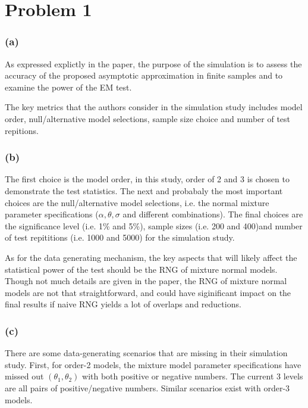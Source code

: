 \documentclass{article}
\begin{document}
\section*{Problem 1}

\subsubsection*{(a)}

\hspace{12 pt} As expressed explictly in the paper, the purpose of the simulation is to assess the accuracy
of the proposed asymptotic approximation in finite samples and to examine the power of the EM test. 

The key metrics that the authors consider in the simulation study includes model order, null/alternative 
model selections, sample size choice and number of test repitions.

\subsubsection*{(b)}

\hspace{12 pt} The first choice is the model order, in this study, order of 2 and 3 is chosen to demonstrate the test statistics.
The next and probabaly the most important choices are the null/alternative model selections, i.e. the normal mixture parameter 
specifications ($\alpha, \theta, \sigma$ and different combinations). 
The final choices are the significance level (i.e. 1\% and 5\%), 
sample sizes (i.e. 200 and 400)and number of test repititions (i.e. 1000 and 5000) for the simulation study.

As for the data generating mechanism, the key aspects that will likely affect the statistical power of the test
should be the RNG of mixture normal models. Though not much details are given in the paper, the RNG of mixture
normal models are not that straightforward, and could have siginificant impact on the final results if naive
RNG yields a lot of overlaps and reductions.

\subsubsection*{(c)}

\hspace{12 pt} There are some data-generating scenarios that are missing in their simulation study.
First, for order-2 models, the mixture model parameter specifications have missed out $(\theta_1,\theta_2)$ with
both positive or negative numbers. The current 3 levels are all pairs of positive/negative numbers.
Similar scenarios exist with order-3 models.
\end{document}
